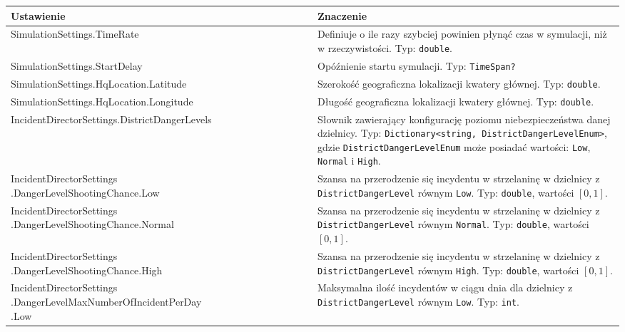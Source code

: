 \begin{longtable}{|p{0.5\linewidth} | p{0.5\linewidth}|} 
     \hline
     Ustawienie & Znaczenie \\
     \hline
     \hline
     SimulationSettings.TimeRate & Definiuje o ile razy szybciej powinien płynąć czas w symulacji, niż w rzeczywistości. Typ: \texttt{double}. \\ 
     \hline
     SimulationSettings.StartDelay & Opóźnienie startu symulacji. Typ: \texttt{TimeSpan?} \\ 
     \hline
     SimulationSettings.HqLocation.Latitude & Szerokość geograficzna lokalizacji kwatery głównej. Typ: \texttt{double}. \\ 
     \hline
     SimulationSettings.HqLocation.Longitude & Długość geograficzna lokalizacji kwatery głównej. Typ: \texttt{double}. \\ 
     \hline
     IncidentDirectorSettings.DistrictDangerLevels & Słownik zawierający konfigurację poziomu niebezpieczeństwa danej dzielnicy. Typ: \texttt{Dictionary<string, DistrictDangerLevelEnum>}, gdzie \texttt{DistrictDangerLevelEnum} może posiadać wartości: \texttt{Low}, \texttt{Normal} i \texttt{High}. \\ 
     \hline
     \makecell[tl]{IncidentDirectorSettings\\.DangerLevelShootingChance.Low} & Szansa na przerodzenie się incydentu w strzelaninę w dzielnicy z \texttt{DistrictDangerLevel} równym \texttt{Low}. Typ: \texttt{double}, wartości $[0, 1]$. \\ 
     \hline
     \makecell[tl]{IncidentDirectorSettings\\.DangerLevelShootingChance.Normal} & Szansa na przerodzenie się incydentu w strzelaninę w dzielnicy z \texttt{DistrictDangerLevel} równym \texttt{Normal}. Typ: \texttt{double}, wartości $[0, 1]$. \\ 
     \hline
     \makecell[tl]{IncidentDirectorSettings\\.DangerLevelShootingChance.High} & Szansa na przerodzenie się incydentu w strzelaninę w dzielnicy z \texttt{DistrictDangerLevel} równym \texttt{High}. Typ: \texttt{double}, wartości $[0, 1]$. \\ 
     \hline
     \makecell[tl]{IncidentDirectorSettings\\.DangerLevelMaxNumberOfIncidentPerDay\\.Low} & Maksymalna ilość incydentów w ciągu dnia dla dzielnicy z \texttt{DistrictDangerLevel} równym \texttt{Low}. Typ: \texttt{int}. \\ 
     \hline

\end{longtable}
